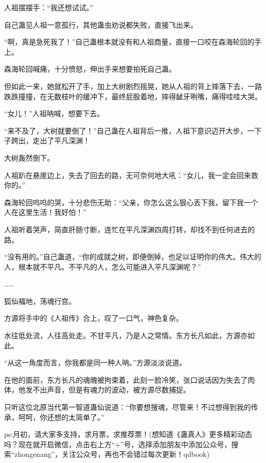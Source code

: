 \begin{this_body}
人祖摆摆手：“我还想试试。”

自己蛊见人祖一意孤行，其他蛊虫劝说都失败，直接飞出来。

“啊，真是急死我了！”自己蛊根本就没有和人祖商量，直接一口咬在森海轮回的手上。

森海轮回喊痛，十分愤怒，伸出手来想要拍死自己蛊。

但如此一来，她就松开了手，加上大树剧烈摇晃，她从人祖的背上摔落下去，一路跌跌撞撞，在无数枝叶的缓冲下，最终屁股着地，摔得龇牙咧嘴，痛得哇哇大哭。

“女儿！”人祖呐喊，想要下去。

“来不及了，大树就要倒了！”自己蛊在人祖背后一推，人祖下意识迈开大步，一下子跨出，走出了平凡深渊！

大树轰然倒下。

人祖趴在悬崖边上，失去了回去的路，无可奈何地大吼：“女儿，我一定会回来救你的。”

森海轮回呜呜的哭，十分悲伤无助：“父亲，你怎么这么狠心丢下我，留下我一个人在这里生活！我好怕！”

人祖听着哭声，简直肝肠寸断，连忙在平凡深渊四周打转，却找不到任何进去的路。

“没有用的。”自己蛊道，“你的成就之树，即便倒掉，也足以证明你的伟大。伟大的人，根本就不平凡。不平凡的人，怎么可能进入平凡深渊呢？”

……

狐仙福地，荡魂行宫。

方源将手中的《人祖传》合上，叹了一口气，神色复杂。

水往低处流，人往高处走。不甘平凡，乃是人之常情。东方长凡如此，方源亦如此。

“从这一角度而言，你我都是同一种人呐。”方源淡淡说道。

在他的面前，东方长凡的魂魄被拘束着，此刻一脸冷笑，张口说话因为失去了肉体，他发不出声音，但是有魂力的波动，被方源尽数捕捉。

只听这位北原当代第一智道蛊仙说道：“你要想搜魂，尽管来！不过想得到我的传承，呵呵，你还想的太简单了。”

ps:月初，请大家多支持，求月票，求推荐票！(想知道《蛊真人》更多精彩动态吗？现在就开启微信，点击右上方“+”号，选择添加朋友中添加公众号，搜索“zhongenang”，关注公众号，再也不会错过每次更新！qdbook)

\end{this_body}

